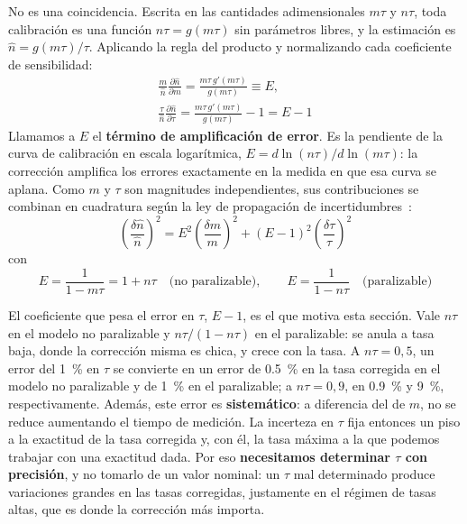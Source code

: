 No es una coincidencia. Escrita en las cantidades adimensionales $m\tau$ y
$n\tau$, toda calibración es una función $n\tau = g(m\tau)$ sin parámetros
libres, y la estimación es $\hat n = g(m\tau)/\tau$. Aplicando la regla del
producto y normalizando cada coeficiente de sensibilidad:
\begin{equation}
  \begin{gathered}
  \frac{m}{\hat n}\frac{\partial \hat n}{\partial m}
    = \frac{m\tau\,g'(m\tau)}{g(m\tau)} \equiv E, \\
  \frac{\tau}{\hat n}\frac{\partial \hat n}{\partial \tau}
    = \frac{m\tau\,g'(m\tau)}{g(m\tau)} - 1 = E-1
  \end{gathered}
  \label{e:mca-E}
\end{equation}
Llamamos a $E$ el \textbf{término de amplificación de error}. Es la pendiente de
la curva de calibración en escala logarítmica,
$E = d\ln(n\tau)/d\ln(m\tau)$: la corrección amplifica los errores exactamente
en la medida en que esa curva se aplana. Como $m$ y $\tau$ son magnitudes
independientes, sus contribuciones se combinan en cuadratura según la ley de
propagación de incertidumbres~\cite{GUM2008}:
\begin{equation}
  \left(\frac{\delta \hat n}{\hat n}\right)^{2}
    = E^{2}\left(\frac{\delta m}{m}\right)^{2}
    + (E-1)^{2}\left(\frac{\delta \tau}{\tau}\right)^{2}
  \label{e:mca-cuadratura}
\end{equation}
con
\begin{equation}
  E = \frac{1}{1-m\tau} = 1+n\tau \quad\text{(no paralizable)}, \qquad
  E = \frac{1}{1-n\tau} \quad\text{(paralizable)}
  \label{e:mca-E-modelos}
\end{equation}

El coeficiente que pesa el error en $\tau$, $E-1$, es el que motiva esta
sección. Vale $n\tau$ en el modelo no paralizable y $n\tau/(1-n\tau)$ en el
paralizable: se anula a tasa baja, donde la corrección misma es chica, y crece
con la tasa. A $n\tau = 0,5$, un error del \qty{1}{\percent} en $\tau$ se
convierte en un error de \qty{0.5}{\percent} en la tasa corregida en el modelo
no paralizable y de \qty{1}{\percent} en el paralizable; a $n\tau = 0,9$, en
\qty{0.9}{\percent} y \qty{9}{\percent}, respectivamente. Además, este error es
\textbf{sistemático}: a diferencia del de $m$, no se reduce aumentando el tiempo
de medición. La incerteza en $\tau$ fija entonces un piso a la exactitud de la
tasa corregida y, con él, la tasa máxima a la que podemos trabajar con una
exactitud dada. Por eso \textbf{necesitamos determinar $\tau$ con precisión}, y
no tomarlo de un valor nominal: un $\tau$ mal determinado produce variaciones
grandes en las tasas corregidas, justamente en el régimen de tasas altas, que es
donde la corrección más importa.

